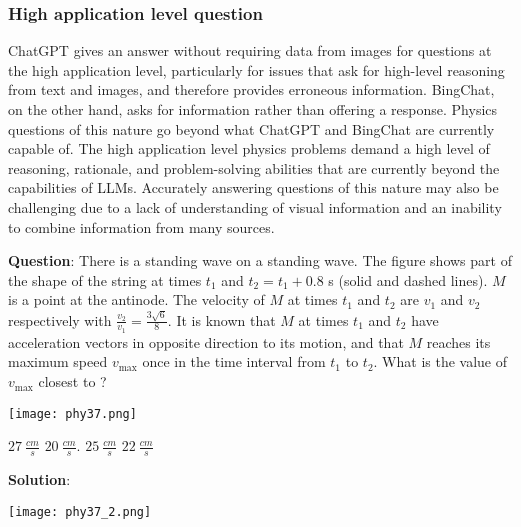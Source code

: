 \documentclass{article}
\begin{document}
{\begin{mdframed}[linewidth=1pt,linecolor=red]
	\end{mdframed}	
	
	\subsubsection{High application level question}
	
	\label{VNHSGE_Phy_H}
	
	ChatGPT gives an answer without requiring data from images for questions at the high application level, particularly for issues that ask for high-level reasoning from text and images, and therefore provides erroneous information. BingChat, on the other hand, asks for information rather than offering a response. Physics questions of this nature go beyond what ChatGPT and BingChat are currently capable of. The high application level physics problems demand a high level of reasoning, rationale, and problem-solving abilities that are currently beyond the capabilities of LLMs. Accurately answering questions of this nature may also be challenging due to a lack of understanding of visual information and an inability to combine information from many sources.
	
	
	\begin{mdframed}[linewidth=1pt,linecolor=red] \textbf{Question}: There is a standing wave on a standing wave. The figure shows part of the shape of the string at times $t_1$ and $t_2=t_1+0.8$ s (solid and dashed lines). $M$ is a point at the antinode. The velocity of $M$ at times $t_1$ and $t_2$ are $v_1$ and $v_2$ respectively with $\frac{v_2}{v_1}=\frac{3\sqrt{6}}{8}$. It is known that $M$ at times $t_1$ and $t_2$ have acceleration vectors in opposite direction to its motion, and that $M$ reaches its maximum speed $v_{\max}$ once in the time interval from $t_1$ to $t_2$. What is the value of $v_{\max}$ closest to ?
		
		\texttt{[image: phy37.png]}
		
		\begin{oneparchoices}
			\choice $27~\frac{cm}{s}$
			\choice $20~\frac{cm}{s}$.
			\choice $25~\frac{cm}{s}$
			\choice $22~\frac{cm}{s}$
		\end{oneparchoices}
		
		\textbf{Solution}: 
		
		\texttt{[image: phy37\_2.png]}
		

\end{mdframed}}
\end{document}
